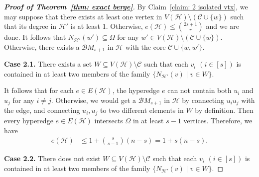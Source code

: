 \documentclass[11pt]{article}
\numberwithin{equation}{section}
\newtheorem{cla}{Claim}
\newcommand\cB{{\mathcal B}}
\newcommand\cC{{\mathcal C}}
\newcommand\cE{{\mathcal E}}
\newcommand\cH{{\mathcal H}}
\begin{document}
\begin{proof}[\bf Proof of Theorem~\ref{thm: exact berge}]
    By Claim~\ref{claim: 2 isolated vtx}, we may suppose that there exists at least one vertex in $V(\cH)\setminus \left(\cC \cup\{w\}\right)$ such that its degree in $\cH'$ is at least 1. Otherwise, $e(\cH)\leq \binom{2s+1}{r}$ and we are done.
    It follows that $N_{\cH'}(w') \subseteq \Omega$ for any $w' \in V(\cH)\setminus \left(\cC \cup\{w\}\right)$. Otherwise, there exists a $\cB M_{s+1}$ in $\cH$ with the core $\cC\cup\{w,w'\}$.





    \smallskip
    \noindent\textbf{Case 2.1.}
    There exists a set $W \subseteq V(\cH)\setminus \cC$ such that each $v_i$ $(i\in [s])$ is contained in at least two members of the family $\{N_{\cH'}(v)\mid	v\in W\}$.
    \smallskip
    \smallskip

    It follows that for each $e \in E(\mathcal{H})$, the hyperedge $e$ can not contain both $u_i$ and $u_j$ for any $i \neq j$.
    Otherwise, we would get a $\cB M_{s+1}$ in $\cH$ by connecting $u_iu_j$ with the edge, and connecting $u_i,u_j$ to two different elements in $W$ by definition.
    Then every hyperedge $e \in E(\mathcal{H})$ intersects $\Omega$ in at least $s-1$ vertices.
    Therefore, we have
    \begin{equation*}
    \begin{aligned}
        e(\cH) & \leq 1 + \binom{s}{s-1}(n-s) = 1 +s(n-s).
    \end{aligned}
    \end{equation*}


    \smallskip
    \noindent\textbf{Case 2.2.} There does not exist $W \subseteq V(\cH)\setminus \cC$ such that each $v_i$ $(i\in [s])$ is contained in at least two members of the family $\{N_{\cH'}(v)\mid v\in W\}$. %
    \smallskip
    \smallskip


\end{proof}
\end{document}
